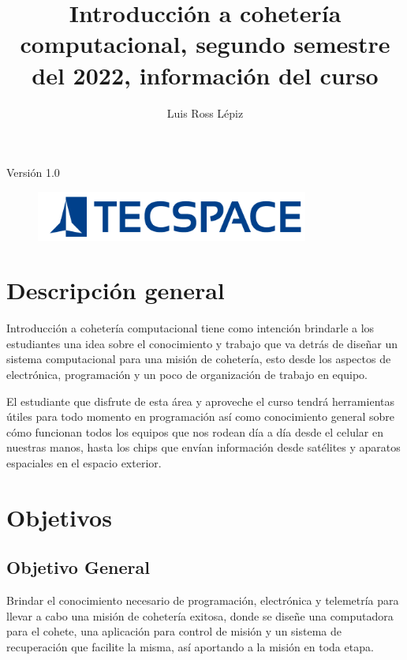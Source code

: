 ﻿\documentclass[letterpaper]{article}
\title{Introducción a cohetería computacional, segundo semestre del 2022, información del curso}
\author{Luis Ross Lépiz}
\begin{document}
\maketitle
\thispagestyle{empty}
\begin{center}
    Versión 1.0
\end{center}

\begin{figure}[b]
    \centering
    \includegraphics[width=0.8\textwidth]{img/logo.png}
\end{figure}
\clearpage

\tableofcontents
\clearpage

\section{Descripción general}
Introducción a cohetería computacional tiene como intención brindarle a los estudiantes una idea
sobre el conocimiento y trabajo que va detrás de diseñar un sistema computacional para una misión de
cohetería, esto desde los aspectos de electrónica, programación y un poco de organización de trabajo
en equipo.

El estudiante que disfrute de esta área y aproveche el curso tendrá herramientas útiles para todo
momento en programación así como conocimiento general sobre cómo funcionan todos los equipos que nos
rodean día a día desde el celular en nuestras manos, hasta los chips que envían información desde
satélites y aparatos espaciales en el espacio exterior.

\section{Objetivos}
\subsection{Objetivo General}
Brindar el conocimiento necesario de programación, electrónica y telemetría para llevar a cabo una
misión de cohetería exitosa, donde se diseñe una computadora para el cohete, una aplicación para
control de misión y un sistema de recuperación que facilite la misma, así aportando a la misión en
toda etapa.
\end{document}

